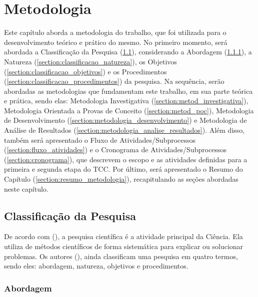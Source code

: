 \chapter[Metodologia]{Metodologia}
\label{cap:metodologia}

Este capítulo aborda a metodologia do trabalho, que foi utilizada para o desenvolvimento teórico e 
prático do mesmo. No primeiro momento, será abordada a Classificação da Pesquisa (\ref{section:classificacao_pesquisa}), considerando a 
Abordagem (\ref{section:classificacao_abordagem}), a Natureza (\ref{section:classificacao_natureza}), os Objetivos (\ref{section:classificacao_objetivos}) e os 
Procedimentos (\ref{section:classificacao_procedimentos}) da pesquisa. Na sequência, serão abordadas as 
metodologias que fundamentam este trabalho, em sua parte teórica e prática, sendo elas: Metodologia Investigativa (\ref{section:metod_investigativa}), 
Metodologia Orientada a Provas de Conceito (\ref{section:metod_poc}), Metodologia de Desenvolvimento (\ref{section:metodologia_desenvolvimento}) e 
Metodologia de Análise de Resultados (\ref{section:metodologia_analise_resultados}). 
Além disso, também será apresentado o Fluxo de Atividades/Subprocessos (\ref{section:fluxo_atividades}) 
e o Cronograma de Atividades/Subprocessos (\ref{section:cronograma}), que 
descrevem o escopo e as atividades definidas para a primeira e segunda etapa do TCC.
Por último, será apresentado o Resumo do Capítulo (\ref{section:resumo_metodologia}), recapitulando as seções abordadas neste capítulo.


\section{Classificação da Pesquisa}
\label{section:classificacao_pesquisa}

De acordo com  (\citeyear{gerhardt2009metodos}), a pesquisa científica é a atividade principal da Ciência. Ela utiliza de 
métodos científicos de forma sistemática para explicar ou solucionar problemas. 
Os autores  (\citeyear{gerhardt2009metodos}), ainda 
classificam uma pesquisa em quatro termos, sendo eles: abordagem, natureza, objetivos e procedimentos.

\subsection{Abordagem}
\label{section:classificacao_abordagem}

